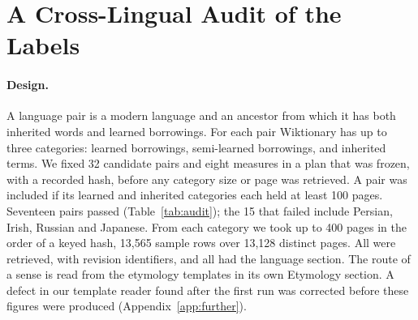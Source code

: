 \documentclass[11pt]{article}
\begin{document}
\section{A Cross-Lingual Audit of the Labels}
\label{sec:audit}

\paragraph{Design.} A language pair is a modern language and an ancestor from which it has both inherited words and learned borrowings. For each pair Wiktionary has up to three categories: learned borrowings, semi-learned borrowings, and inherited terms. We fixed 32 candidate pairs and eight measures in a plan that was frozen, with a recorded hash, before any category size or page was retrieved. A pair was included if its learned and inherited categories each held at least 100 pages. Seventeen pairs passed (Table~\ref{tab:audit}); the 15 that failed include Persian, Irish, Russian and Japanese. From each category we took up to 400 pages in the order of a keyed hash, 13,565 sample rows over 13,128 distinct pages. All were retrieved, with revision identifiers, and all had the language section. The route of a sense is read from the etymology templates in its own Etymology section. A defect in our template reader found after the first run was corrected before these figures were produced (Appendix~\ref{app:further}).
\end{document}
